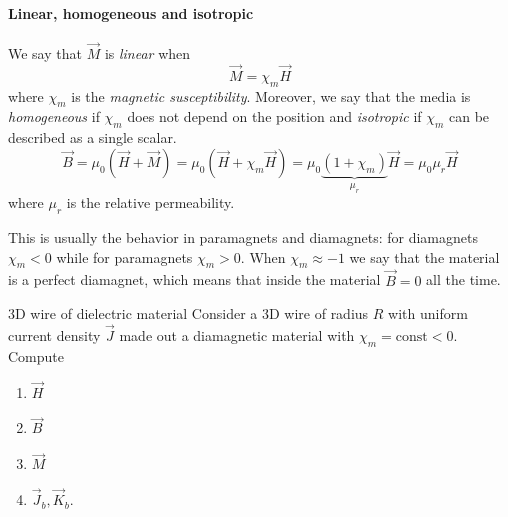 \documentclass[12pt]{extarticle}
\begin{document}
\paragraph{Linear, homogeneous and isotropic}
We say that $\vec M$ is \emph{linear} when
\begin{equation}
    \vec M = \chi_m \vec H
\end{equation}
where $\chi_m$ is the \emph{magnetic susceptibility}.
Moreover, we say that the media is \emph{homogeneous} if $\chi_m$ does not depend on the position
and \emph{isotropic} if $\chi_m$ can be described as a single scalar.
\begin{equation}
    \vec B = \mu_0(\vec H + \vec M) = \mu_0 (\vec H + \chi_m \vec H) = \mu_0 \underbrace{(1+\chi_m)}_{\mu_r} \vec H = \mu_0 \mu_r \vec H
\end{equation}
where $\mu_r$ is the relative permeability.

This is usually the behavior in paramagnets and diamagnets: for diamagnets $\chi_m < 0$ while for paramagnets $\chi_m > 0$.
When $\chi_m \approx -1$ we say that the material is a perfect diamagnet, which means that inside the material $\vec B = 0$ all the time.

\begin{example}{3D wire of dielectric material}{}
    Consider a 3D wire of radius $R$ with uniform current density $\vec J$ made out a diamagnetic material with $\chi_m = \text{const} < 0$.
    Compute
    \begin{enumerate}
        \item $\vec H$
        \item $\vec B$
        \item $\vec M$
        \item $\vec J_b, \vec K_b$.
    \end{enumerate}
\end{example}
\end{document}
